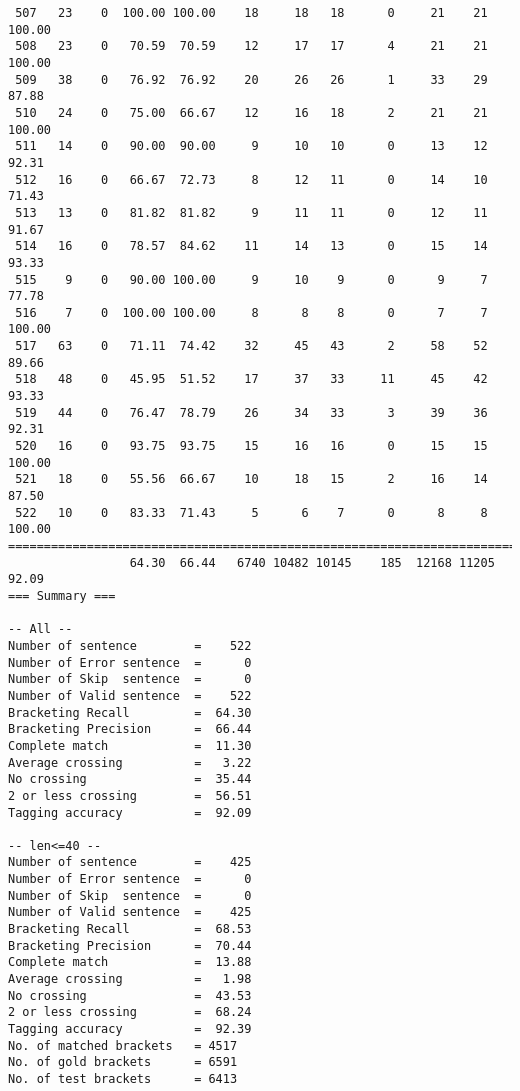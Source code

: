 \begin{verbatim}
 507   23    0  100.00 100.00    18     18   18      0     21    21   100.00
 508   23    0   70.59  70.59    12     17   17      4     21    21   100.00
 509   38    0   76.92  76.92    20     26   26      1     33    29    87.88
 510   24    0   75.00  66.67    12     16   18      2     21    21   100.00
 511   14    0   90.00  90.00     9     10   10      0     13    12    92.31
 512   16    0   66.67  72.73     8     12   11      0     14    10    71.43
 513   13    0   81.82  81.82     9     11   11      0     12    11    91.67
 514   16    0   78.57  84.62    11     14   13      0     15    14    93.33
 515    9    0   90.00 100.00     9     10    9      0      9     7    77.78
 516    7    0  100.00 100.00     8      8    8      0      7     7   100.00
 517   63    0   71.11  74.42    32     45   43      2     58    52    89.66
 518   48    0   45.95  51.52    17     37   33     11     45    42    93.33
 519   44    0   76.47  78.79    26     34   33      3     39    36    92.31
 520   16    0   93.75  93.75    15     16   16      0     15    15   100.00
 521   18    0   55.56  66.67    10     18   15      2     16    14    87.50
 522   10    0   83.33  71.43     5      6    7      0      8     8   100.00
============================================================================
                 64.30  66.44   6740 10482 10145    185  12168 11205    92.09
=== Summary ===

-- All --
Number of sentence        =    522
Number of Error sentence  =      0
Number of Skip  sentence  =      0
Number of Valid sentence  =    522
Bracketing Recall         =  64.30
Bracketing Precision      =  66.44
Complete match            =  11.30
Average crossing          =   3.22
No crossing               =  35.44
2 or less crossing        =  56.51
Tagging accuracy          =  92.09

-- len<=40 --
Number of sentence        =    425
Number of Error sentence  =      0
Number of Skip  sentence  =      0
Number of Valid sentence  =    425
Bracketing Recall         =  68.53
Bracketing Precision      =  70.44
Complete match            =  13.88
Average crossing          =   1.98
No crossing               =  43.53
2 or less crossing        =  68.24
Tagging accuracy          =  92.39
No. of matched brackets   = 4517
No. of gold brackets      = 6591
No. of test brackets      = 6413

\end{verbatim}

\normalsize

